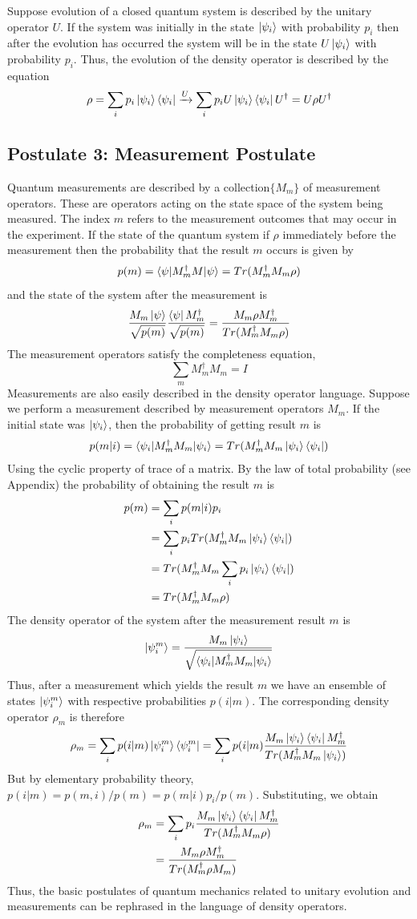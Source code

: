 \documentclass[12pt, oneside]{book}
\theoremstyle{definition}
\theoremstyle{definition}
\theoremstyle{remark}
\begin{document}
Suppose evolution of a closed quantum system is described by the unitary operator $U$. If the system was initially in the state $\ket{\psi_i}$ with probability $p_i$ then after the evolution has occurred the system will be in the state $U\ket{\psi_i}$ with probability $p_i$. Thus, the evolution of the density operator is described by the equation
\[
\rho=\sum_ip_i\ket{\psi_i}\bra{\psi_i} \xrightarrow{U} \sum_i p_iU\ket{\psi_i}\bra{\psi_i}U^{\dagger}=U\rho U^{\dagger}
\]
\subsection{Postulate 3: Measurement Postulate}
Quantum measurements are described by a collection$\{M_m\}$ of measurement operators. These are operators acting on the state space of the system being measured. The index $m$ refers to the measurement outcomes that may occur in the experiment. If the state of the quantum system if $\rho$ immediately before the measurement then the probability that the result $m$ occurs is given by
\[
p(m)=\braket{\psi|M_m^{\dagger}M|\psi}=Tr(M_m^{\dagger}M_m\rho)
\]
and the state of the system after the measurement is 
\[
\frac{M_m\ket{\psi}}{\sqrt{p(m)}}\frac{\bra{\psi}M_m^{\dagger}}{\sqrt{p(m)}}=\frac{M_m\rho M_m^{\dagger}}{Tr(M_m^{\dagger}M_m\rho)}
\]
The measurement operators satisfy the completeness equation,
\[
\sum_mM_m^{\dagger}M_m=I
\]
Measurements are also easily described in the density operator language. Suppose we perform a measurement described by measurement operators $M_m$. If the initial state was $\ket{\psi_i}$, then the probability of getting result $m$ is
\[
p(m|i)=\braket{\psi_i|M_m^{\dagger}M_m|\psi_i}=Tr(M_m^{\dagger}M_m\ket{\psi_i}\bra{\psi_i})
\]
Using the cyclic property of trace of a matrix. By the law of total probability (see Appendix) the probability of obtaining the result $m$ is 
\begin{align*}
p(m)&=\sum_ip(m|i)p_i\\
&=\sum_ip_iTr(M_m^{\dagger}M_m\ket{\psi_i}\bra{\psi_i})\\
&=Tr(M_m^{\dagger}M_m\sum_ip_i\ket{\psi_i}\bra{\psi_i})\\
&=Tr(M_m^{\dagger}M_m\rho)
\end{align*}
The density operator of the system after the measurement result $m$ is 
\[
\ket{\psi_i^m}=\frac{M_m\ket{\psi_i}}{\sqrt{\braket{\psi_i|M_m^{\dagger}M_m|\psi_i}}}
\]
Thus, after a measurement which yields the result $m$ we have an ensemble of states $\ket{\psi_i^m}$ with respective probabilities $p(i|m)$. The corresponding density operator $\rho_m$ is therefore
\[
\rho_m=\sum_ip(i|m)\ket{\psi_i^m}\bra{\psi_i^m}=\sum_ip(i|m)\frac{M_m\ket{\psi_i}\bra{\psi_i}M_m^{\dagger}}{Tr(M_m^{\dagger}M_m\ket{\psi_i})}
\]
But by elementary probability theory, $p(i|m)=p(m,i)/p(m)=p(m|i)p_i/p(m)$. Substituting, we obtain
\begin{align*}
\rho_m&=\sum_ip_i\frac{M_m\ket{\psi_i}\bra{\psi_i}M_m^{\dagger}}{Tr(M_m^{\dagger}M_m\rho)}\\
&=\frac{M_m\rho M_m^{\dagger}}{Tr(M_m^{\dagger}\rho M_m)}
\end{align*}
Thus, the basic postulates of quantum mechanics related to unitary evolution and measurements can be rephrased in the language of density operators.
\end{document}
